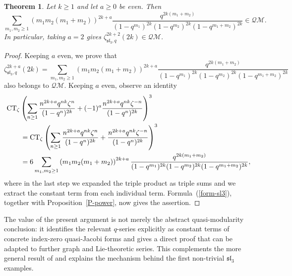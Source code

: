 \documentclass[pdftex]{sigma}
\numberwithin{equation}{section}
\newtheorem{Theorem}{Theorem}[section]
\theoremstyle{definition}
\begin{document}
\begin{Theorem} \label{sl3-qm} Let $k\geq1$ and let $a\geq0$ be even. Then
\[
\sum_{m_1,m_2\geq1}\left(m_1m_2(m_1+m_2)\right)^{2k+a}
\frac{q^{2k(m_1+m_2)}}{(1-q^{m_1})^{2k}(1-q^{m_2})^{2k}(1-q^{m_1+m_2})^{2k}}
\in\mathcal{QM}.
\]
In particular, taking $a=2$ gives $\zeta_{\mathfrak{sl}_3,q}^{2k+2}(2k)\in\mathcal{QM}$.
\end{Theorem}
\begin{proof} Keeping $a$ even, we prove that
\[
\zeta_{\mathfrak{sl}_3,q}^{2k+a}(2k)=\sum_{m_1,m_2 \geq 1} \left( m_1 m_2 (m_1+m_2) \right)^{2k+a} \frac{q^{2k(m_1 +m_2)}}{(1-q^{m_1})^{2k} (1-q^{m_2})^{2k}(1-q^{m_1+m_2})^{2k}}
\]
also belongs to $\mathcal{QM}$.
Keeping $a$ even, observe an identity
\begin{align*}
& {\rm CT}_{\zeta} \left(\sum_{n \geq 1} \frac{n^{2k+a} q^{nk} \zeta^{n}}{(1-q^n)^{2k}}+(-1)^a \frac{n^{2k+a} q^{n k} \zeta^{-n}}{(1-q^n)^{2k}} \right)^3 \\
&\qquad = {\rm CT}_{\zeta} \left(\sum_{n \geq 1} \frac{n^{2k+a} q^{nk} \zeta^{n}}{(1-q^n)^{2k}}+ \frac{n^{2k+a} q^{n k} \zeta^{-n}}{(1-q^n)^{2k}} \right)^3 \\
& \qquad =6 \sum_{m_1,m_2 \geq 1} \left( m_1 m_2 (m_1+m_2) \right)^{2k+a} \frac{q^{2k(m_1 +m_2)}}{(1-q^{m_1})^{2k} (1-q^{m_2})^{2k}(1-q^{m_1+m_2})^{2k}},
\end{align*}
where in the last step we expanded the triple product as triple sums and we extract the constant term from each individual term.
Formula~(\ref{form-sl3}), together with Proposition~\ref{P-power}, now gives the assertion.
\end{proof}

The value of the present argument is not merely the abstract quasi-modularity conclusion: it identifies the relevant $q$-series explicitly as constant terms of concrete index-zero quasi-Jacobi forms and gives a direct proof that can be adapted to further graph and Lie-theoretic series. This complements the more general result of \cite{BVM} and explains the mechanism behind the first non-trivial $\mathfrak{sl}_3$ examples.
\end{document}
